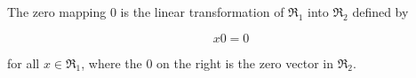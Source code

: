 The zero mapping $0$ is the linear transformation of $\mathfrak{R}_1$ into $\mathfrak{R}_2$ defined by

$$x0 = 0$$

for all $x \in \mathfrak{R}_1$, where the $0$ on the right is the zero vector in $\mathfrak{R}_2$.
